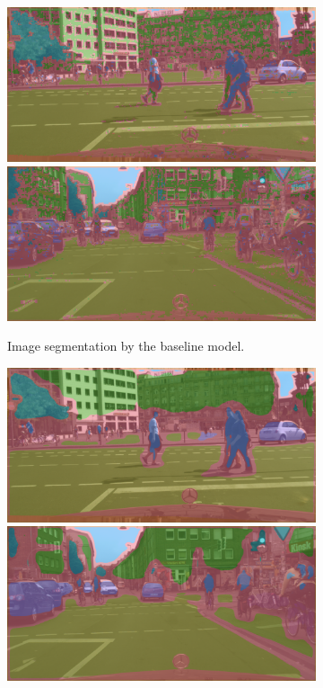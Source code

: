 \begin{figure}[h]
	\begin{subfigure}{.5\textwidth}
		\includegraphics[width=\textwidth]{city_images/baseline_comparison_1.png} \\
		\includegraphics[width=\textwidth]{city_images/baseline_comparison_2.png}
		\caption{Image segmentation by the baseline model.}
	\end{subfigure}
	\begin{subfigure}{.5\textwidth}
		\includegraphics[width=\textwidth]{city_images/swin2_comparison_1.png} \\
		\includegraphics[width=\textwidth]{city_images/swin2_comparison_2.png}

\end{subfigure}
\end{figure}
